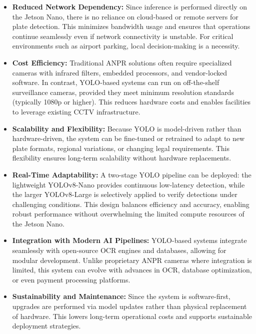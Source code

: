 	\begin{itemize}
		 \item \textbf{Reduced Network Dependency:} Since inference is performed directly on the Jetson Nano, there is no reliance on cloud-based or remote servers for plate detection. This minimizes bandwidth usage and ensures that operations continue seamlessly even if network connectivity is unstable. For critical environments such as airport parking, local decision-making is a necessity.
		
		\item \textbf{Cost Efficiency:} Traditional ANPR solutions often require specialized cameras with infrared filters, embedded processors, and vendor-locked software. In contrast, YOLO-based systems can run on off-the-shelf surveillance cameras, provided they meet minimum resolution standards (typically 1080p or higher). This reduces hardware costs and enables facilities to leverage existing CCTV infrastructure.
		
		\item \textbf{Scalability and Flexibility:} Because YOLO is model-driven rather than hardware-driven, the system can be fine-tuned or retrained to adapt to new plate formats, regional variations, or changing legal requirements. This flexibility ensures long-term scalability without hardware replacements.
		
		\item \textbf{Real-Time Adaptability:} A two-stage YOLO pipeline can be deployed: the lightweight YOLOv8-Nano provides continuous low-latency detection, while the larger YOLOv8-Large is selectively applied to verify detections under challenging conditions. This design balances efficiency and accuracy, enabling robust performance without overwhelming the limited compute resources of the Jetson Nano.
		
		\item \textbf{Integration with Modern AI Pipelines:} YOLO-based systems integrate seamlessly with open-source OCR engines and databases, allowing for modular development. Unlike proprietary ANPR cameras where integration is limited, this system can evolve with advances in OCR, database optimization, or even payment processing platforms.
		
		\item \textbf{Sustainability and Maintenance:} Since the system is software-first, upgrades are performed via model updates rather than physical replacement of hardware. This lowers long-term operational costs and supports sustainable deployment strategies.
		
	\end{itemize}
	
